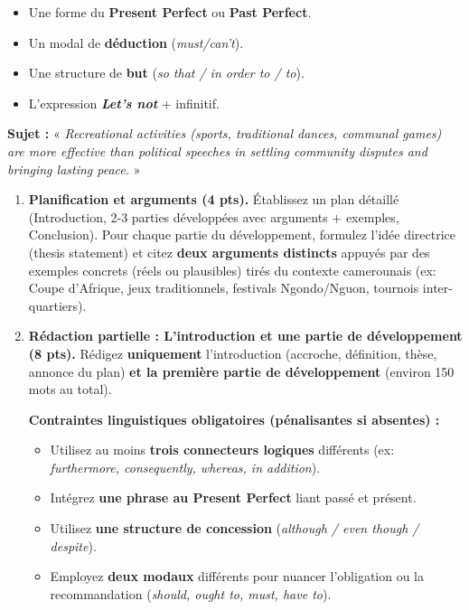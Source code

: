 \documentclass[11pt]{article}
\begin{document}
\begin{exercice}
\begin{enumerate}
    \begin{itemize}
        \item Une forme du \textbf{Present Perfect} ou \textbf{Past Perfect}.
        \item Un modal de \textbf{déduction} (\textit{must/can't}).
        \item Une structure de \textbf{but} (\textit{so that / in order to / to}).
        \item L'expression \textbf{\textit{Let's not}} + infinitif.
    \end{itemize}
\end{enumerate}
\end{exercice}

\begin{exercice}
\textbf{Sujet :} « \textit{Recreational activities (sports, traditional dances, communal games) are more effective than political speeches in settling community disputes and bringing lasting peace.} »

\begin{enumerate}
    \item \textbf{Planification et arguments (4 pts).} Établissez un plan détaillé (Introduction, 2-3 parties développées avec arguments + exemples, Conclusion). Pour chaque partie du développement, formulez l'idée directrice (thesis statement) et citez \textbf{deux arguments distincts} appuyés par des exemples concrets (réels ou plausibles) tirés du contexte camerounais (ex: Coupe d'Afrique, jeux traditionnels, festivals Ngondo/Nguon, tournois inter-quartiers).
    \item \textbf{Rédaction partielle : L'introduction et une partie de développement (8 pts).} Rédigez \textbf{uniquement} l'introduction (accroche, définition, thèse, annonce du plan) \textbf{et la première partie de développement} (environ 150 mots au total).

    \textbf{Contraintes linguistiques obligatoires (pénalisantes si absentes) :}
    \begin{itemize}
        \item Utilisez au moins \textbf{trois connecteurs logiques} différents (ex: \textit{furthermore, consequently, whereas, in addition}).
        \item Intégrez \textbf{une phrase au Present Perfect} liant passé et présent.
        \item Utilisez \textbf{une structure de concession} (\textit{although / even though / despite}).
        \item Employez \textbf{deux modaux} différents pour nuancer l'obligation ou la recommandation (\textit{should, ought to, must, have to}).
    \end{itemize}
\end{enumerate}
\end{exercice}
\end{document}
